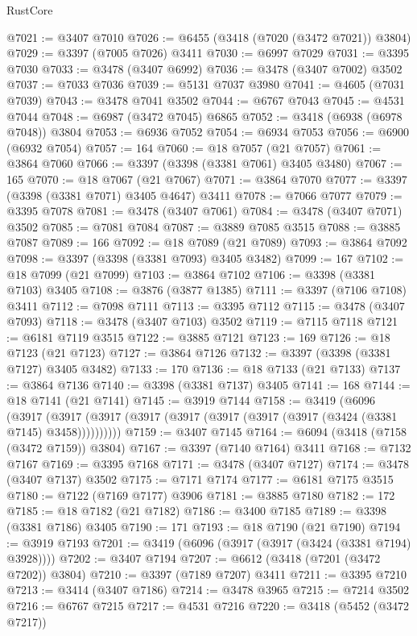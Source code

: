 \begin{lexlean}{RustCore}
\begin{coremodule}
@7021 := @3407 @7010
@7026 := @6455 (@3418 (@7020 (@3472 @7021)) @3804)
@7029 := @3397 (@7005 @7026) @3411
@7030 := @6997 @7029
@7031 := @3395 @7030
@7033 := @3478 (@3407 @6992)
@7036 := @3478 (@3407 @7002) @3502
@7037 := @7033 @7036
@7039 := @5131 @7037 @3980
@7041 := @4605 (@7031 @7039)
@7043 := @3478 @7041 @3502
@7044 := @6767 @7043
@7045 := @4531 @7044
@7048 := @6987 (@3472 @7045) @6865
@7052 := @3418 (@6938 (@6978 @7048)) @3804
@7053 := @6936 @7052
@7054 := @6934 @7053
@7056 := @6900 (@6932 @7054)
@7057 := 164
@7060 := @18 @7057 (@21 @7057)
@7061 := @3864 @7060
@7066 := @3397 (@3398 (@3381 @7061) @3405 @3480)
@7067 := 165
@7070 := @18 @7067 (@21 @7067)
@7071 := @3864 @7070
@7077 := @3397 (@3398 (@3381 @7071) @3405 @4647) @3411
@7078 := @7066 @7077
@7079 := @3395 @7078
@7081 := @3478 (@3407 @7061)
@7084 := @3478 (@3407 @7071) @3502
@7085 := @7081 @7084
@7087 := @3889 @7085 @3515
@7088 := @3885 @7087
@7089 := 166
@7092 := @18 @7089 (@21 @7089)
@7093 := @3864 @7092
@7098 := @3397 (@3398 (@3381 @7093) @3405 @3482)
@7099 := 167
@7102 := @18 @7099 (@21 @7099)
@7103 := @3864 @7102
@7106 := @3398 (@3381 @7103) @3405
@7108 := @3876 (@3877 @1385)
@7111 := @3397 (@7106 @7108) @3411
@7112 := @7098 @7111
@7113 := @3395 @7112
@7115 := @3478 (@3407 @7093)
@7118 := @3478 (@3407 @7103) @3502
@7119 := @7115 @7118
@7121 := @6181 @7119 @3515
@7122 := @3885 @7121
@7123 := 169
@7126 := @18 @7123 (@21 @7123)
@7127 := @3864 @7126
@7132 := @3397 (@3398 (@3381 @7127) @3405 @3482)
@7133 := 170
@7136 := @18 @7133 (@21 @7133)
@7137 := @3864 @7136
@7140 := @3398 (@3381 @7137) @3405
@7141 := 168
@7144 := @18 @7141 (@21 @7141)
@7145 := @3919 @7144
@7158 := @3419
    (@6096
      (@3917 (@3917 (@3917 (@3917 (@3917 (@3917 (@3917 (@3917 (@3424 (@3381 @7145) @3458))))))))))
@7159 := @3407 @7145
@7164 := @6094 (@3418 (@7158 (@3472 @7159)) @3804)
@7167 := @3397 (@7140 @7164) @3411
@7168 := @7132 @7167
@7169 := @3395 @7168
@7171 := @3478 (@3407 @7127)
@7174 := @3478 (@3407 @7137) @3502
@7175 := @7171 @7174
@7177 := @6181 @7175 @3515
@7180 := @7122 (@7169 @7177) @3906
@7181 := @3885 @7180
@7182 := 172
@7185 := @18 @7182 (@21 @7182)
@7186 := @3400 @7185
@7189 := @3398 (@3381 @7186) @3405
@7190 := 171
@7193 := @18 @7190 (@21 @7190)
@7194 := @3919 @7193
@7201 := @3419 (@6096 (@3917 (@3917 (@3424 (@3381 @7194) @3928))))
@7202 := @3407 @7194
@7207 := @6612 (@3418 (@7201 (@3472 @7202)) @3804)
@7210 := @3397 (@7189 @7207) @3411
@7211 := @3395 @7210
@7213 := @3414 (@3407 @7186)
@7214 := @3478 @3965
@7215 := @7214 @3502
@7216 := @6767 @7215
@7217 := @4531 @7216
@7220 := @3418 (@5452 (@3472 @7217))

\end{coremodule}
\end{lexlean}
